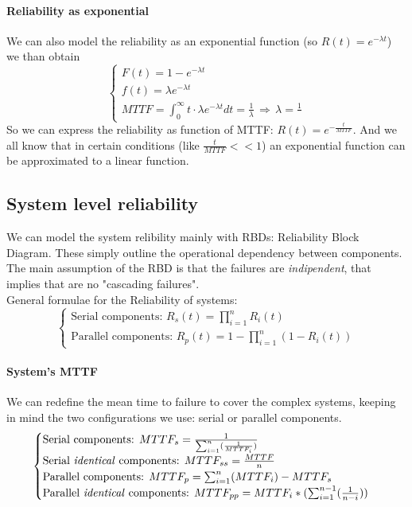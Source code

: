 \documentclass{article}
\begin{document}
				\paragraph{Reliability as exponential}
					We can also model the reliability as an exponential function (so $R(t) = e^{-\lambda t}$) we than obtain
					\begin{equation}
						\begin{cases}
							F(t) = 1 - e^{-\lambda t} \\
							f(t) = \lambda e^{-\lambda t} \\
							MTTF = \int_{0}^{\infty} t\cdot \lambda e^{-\lambda t} dt = \frac{1}{\lambda} \,\Rightarrow\, \lambda = \frac{1}{}
						\end{cases}
					\end{equation}
					So we can express the reliability as function of MTTF: $R(t) = e^{-\frac{t}{MTTF}}$. And we all know that in certain conditions (like $\frac{t}{MTTF} << 1$) an exponential function can be approximated to a linear function.

			\subsection{System level reliability}
				We can model the system relibility mainly with RBDs: Reliability Block Diagram. These simply outline the operational dependency between components. The main assumption of the RBD is that the failures are \emph{indipendent}, that implies that are no "cascading failures".\\
				General formulae for the Reliability of systems:
				\begin{equation}
					\begin{cases}
						\text{Serial components: } R_s(t) = \prod_{i=1}^{n}R_i(t)\\
						\text{Parallel components: } R_p(t) = 1 - \prod_{i=1}^{n} (1-R_i(t))
					\end{cases}
				\end{equation}

				\paragraph{System's MTTF}	
				We can redefine the mean time to failure to cover the complex systems, keeping in mind the two configurations we use: serial or parallel components.
				\begin{equation}
					\begin{cases}
						\text{Serial components: } MTTF_s = \frac{1}{\sum_{i = 1}^{n}(\frac{1}{MTTF_i})} \\
						\text{Serial \emph{identical} components: } MTTF_{ss} = \frac{MTTF}{n} \\
						\text{Parallel components: } MTTF_p = \sum_{i = 1}^{n}(MTTF_i) - MTTF_s \\
						\text{Parallel \emph{identical} components: } MTTF_{pp} = MTTF_i * (\sum_{i = 1}^{n - 1} (\frac{1}{n - i}))
					\end{cases}
				\end{equation}
\end{document}
